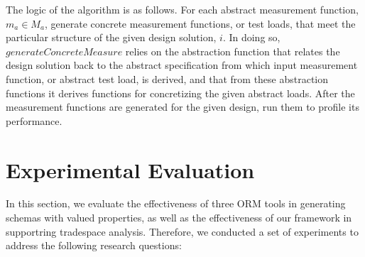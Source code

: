 \documentclass[10pt,conference]{IEEEtran}
\begin{document}
The logic of the algorithm is as follows. For each abstract measurement function, $m_a \in M_a$, generate concrete measurement functions, or test loads, that meet the particular structure of the given design solution, $i$. In doing so, $generateConcreteMeasure$ relies on the abstraction function that relates the design solution back to the abstract specification from which input measurement function, or abstract test load, is derived, and that from these abstraction functions it derives functions for concretizing  the given abstract loads. After the measurement functions are generated for the given design, run them to profile its performance.




\section{Experimental Evaluation}
\label{evaluation}
In this section, we evaluate the effectiveness of three ORM tools in generating schemas with valued properties, as well as the effectiveness of our framework in supportring tradespace analysis. Therefore, we conducted a set of experiments to address the following research questions:
\end{document}
